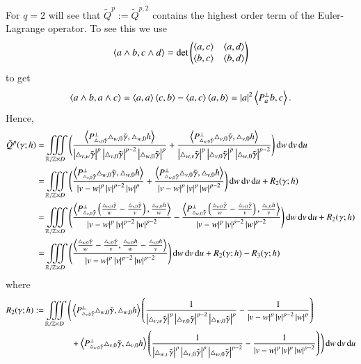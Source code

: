 For $q=2$ will see that $\tilde Q^p := \tilde Q^{p,2}$ contains the highest order term of the Euler-Lagrange operator.
To see this we use
$$
 \left\langle a\wedge b , c\wedge d  \right\rangle = \det \begin{pmatrix}\sp{a,c} & \sp{a,d} \\
                                                           \sp{b,c} & \sp{b,d}
                                                          \end{pmatrix} 
$$
to get 
\begin{equation}\label{eq:abac}
 \left\langle a \wedge b, a \wedge c\right\rangle = \sp{a,a}\sp{c,b} - \sp{a,c}\sp{a,b} 
 = |a|^2\left\langle P^\bot_{a} b, c \right\rangle.
\end{equation}
Hence,
\begin{align*}
\tilde Q^{p}(\gamma;h) &= \iiint\limits_{\mathbb R / \mathbb Z \times D } \Bigg(
 \frac{\sp{P^\bot_{\T v0}\T w0,\T[h] w0}}{\abs{\T vw}^p\abs{\T v0}^{p-2}\abs{\T w0}^p}
+
 \frac{\sp{P^\bot_{\T w0}\T v0,\T[h] v0}}{\abs{\T wv}^p\abs{\T v0}^p\abs{\T w0}^{p-2}}
 \Bigg)\d w \d v \d u
\\
&=    \iiint\limits_{\mathbb R / \mathbb Z \times D } \Bigg( \frac{\sp{P^\bot_{\T v0}\T w0,\T[h] w0}}{\abs{v-w}^p\abs{v}^{p-2}\abs{w}^p}
+
 \frac{\sp{P^\bot_{\T w0}\T v0,\T[h] v0}}{\abs{v-w}^p\abs{v}^p\abs{w}^{p-2}}
 \Bigg)\d w \d v \d u + R_2(\gamma;h) \\
& =   \iiint\limits_{\mathbb R / \mathbb Z \times D } \Bigg( \frac{\sp{P^\bot_{\T v0} \br{\frac {\T w0}{w}
- \frac {\T v0}{v}},\frac{\T[h] w0}{w}}}{\abs{v-w}^p\abs{v}^{p-2}\abs{w}^{p-2}}
-
 \frac{\sp{P^\bot_{\T w0} \br{\frac {\T w0}{w}
- \frac {\T v0}{v}},\frac{\T[h] v0}{v}}}{\abs{v-w}^p\abs{v}^{p-2}\abs{w}^{p-2}}
 \Bigg)\d w \d v \d u + R_2(\gamma;h) \\
& =   \iiint\limits_{\mathbb R / \mathbb Z \times D } \Bigg( \frac{\sp{\frac {\T w0}{w}
- \frac {\T v0}{v},\frac{\T[h] w0}{w}-\frac{\T[h] v0}{v}}}{\abs{v-w}^p\abs{v}^{p-2}\abs{w}^{p-2}}
 \Bigg)\d w \d v \d u + R_2(\gamma;h) - R_3(\gamma;h) \\
\end{align*}
where
\begin{align*}
 R_2 (\gamma;h) := \iiint\limits_{\mathbb R / \mathbb Z \times D } \Bigg(
 &\sp{P^\bot_{\T v0}\T w0,\T[h] w0}  \left( \frac 1{\abs{\T vw}^p\abs{\T v0}^{p-2}\abs{\T w0}^p} 
 - \frac 1{\abs{v-w}^p\abs{v}^{p-2}\abs{w}^p}\right)
 \\ &+
 \sp{P^\bot_{\T w0}\T v0,\T[h] v0} \left( \frac 1 {\abs{\T wv}^p\abs{\T v0}^p\abs{\T w0}^{p-2}}
  - \frac 1 {\abs{v-w}^p\abs{v}^p\abs{w}^{p-2}}\right)
 \Bigg)\d w \d v \d u
\end{align*}
